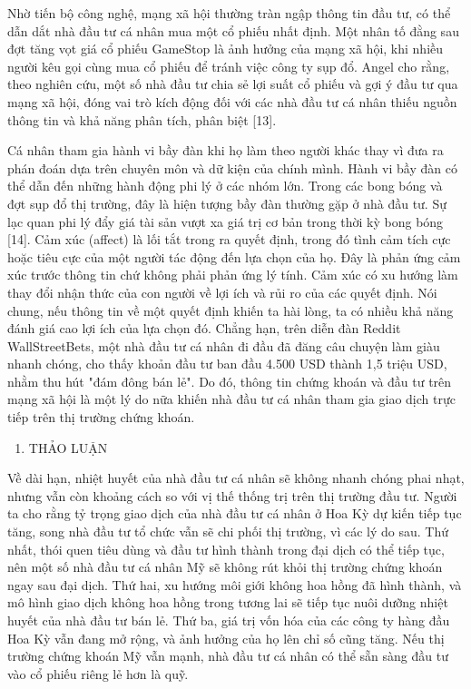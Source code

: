 Nhờ tiến bộ công nghệ, mạng xã hội thường tràn ngập thông tin đầu tư, có thể dẫn dắt nhà đầu tư cá nhân mua một cổ phiếu nhất định. Một nhân tố đằng sau đợt tăng vọt giá cổ phiếu GameStop là ảnh hưởng của mạng xã hội, khi nhiều người kêu gọi cùng mua cổ phiếu để tránh việc công ty sụp đổ. Angel cho rằng, theo nghiên cứu, một số nhà đầu tư chia sẻ lợi suất cổ phiếu và gợi ý đầu tư qua mạng xã hội, đóng vai trò kích động đối với các nhà đầu tư cá nhân thiếu nguồn thông tin và khả năng phân tích, phân biệt {[}13{]}.

Cá nhân tham gia hành vi bầy đàn khi họ làm theo người khác thay vì đưa ra phán đoán dựa trên chuyên môn và dữ kiện của chính mình. Hành vi bầy đàn có thể dẫn đến những hành động phi lý ở các nhóm lớn. Trong các bong bóng và đợt sụp đổ thị trường, đây là hiện tượng bầy đàn thường gặp ở nhà đầu tư. Sự lạc quan phi lý đẩy giá tài sản vượt xa giá trị cơ bản trong thời kỳ bong bóng {[}14{]}. Cảm xúc (affect) là lối tắt trong ra quyết định, trong đó tình cảm tích cực hoặc tiêu cực của một người tác động đến lựa chọn của họ. Đây là phản ứng cảm xúc trước thông tin chứ không phải phản ứng lý tính. Cảm xúc có xu hướng làm thay đổi nhận thức của con người về lợi ích và rủi ro của các quyết định. Nói chung, nếu thông tin về một quyết định khiến ta hài lòng, ta có nhiều khả năng đánh giá cao lợi ích của lựa chọn đó. Chẳng hạn, trên diễn đàn Reddit WallStreetBets, một nhà đầu tư cá nhân đi đầu đã đăng câu chuyện làm giàu nhanh chóng, cho thấy khoản đầu tư ban đầu 4.500 USD thành 1,5 triệu USD, nhằm thu hút "đám đông bán lẻ". Do đó, thông tin chứng khoán và đầu tư trên mạng xã hội là một lý do nữa khiến nhà đầu tư cá nhân tham gia giao dịch trực tiếp trên thị trường chứng khoán.

\begin{enumerate}
\def\labelenumi{\arabic{enumi}.}
\setcounter{enumi}{2}
\item
  THẢO LUẬN
\end{enumerate}

Về dài hạn, nhiệt huyết của nhà đầu tư cá nhân sẽ không nhanh chóng phai nhạt, nhưng vẫn còn khoảng cách so với vị thế thống trị trên thị trường đầu tư. Người ta cho rằng tỷ trọng giao dịch của nhà đầu tư cá nhân ở Hoa Kỳ dự kiến tiếp tục tăng, song nhà đầu tư tổ chức vẫn sẽ chi phối thị trường, vì các lý do sau. Thứ nhất, thói quen tiêu dùng và đầu tư hình thành trong đại dịch có thể tiếp tục, nên một số nhà đầu tư cá nhân Mỹ sẽ không rút khỏi thị trường chứng khoán ngay sau đại dịch. Thứ hai, xu hướng môi giới không hoa hồng đã hình thành, và mô hình giao dịch không hoa hồng trong tương lai sẽ tiếp tục nuôi dưỡng nhiệt huyết của nhà đầu tư bán lẻ. Thứ ba, giá trị vốn hóa của các công ty hàng đầu Hoa Kỳ vẫn đang mở rộng, và ảnh hưởng của họ lên chỉ số cũng tăng. Nếu thị trường chứng khoán Mỹ vẫn mạnh, nhà đầu tư cá nhân có thể sẵn sàng đầu tư vào cổ phiếu riêng lẻ hơn là quỹ.

